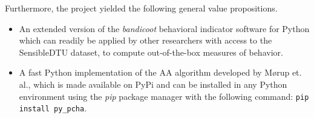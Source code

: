 Furthermore, the project yielded the following general value propositions.

\begin{itemize}
	\item An extended version of the \textit{bandicoot} behavioral indicator software for Python which can readily be applied by other researchers with access to the SensibleDTU dataset, to compute out-of-the-box measures of behavior.
	\item A fast Python implementation of the AA algorithm developed by M\o rup et. al., which is made available on PyPi and can be installed in any Python environment using the \textit{pip} package manager with the following command: \texttt{pip install py\_pcha}.
\end{itemize}